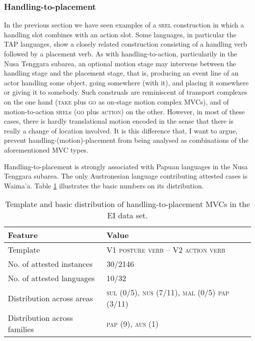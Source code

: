 \subsubsection{Handling-to-placement} \label{sec:handling-to-placement}
In the previous section we have seen examples of a \textsc{srel} construction in which a handling slot combines with an action slot. Some languages, in particular the \acs{TAP} languages, show a closely related construction consisting of a handling verb followed by a placement verb. As with handling-to-action, particularily in the Nusa Tenggara subarea, an optional motion stage may intervene between the handling stage and the placement stage, that is, producing an event line of an actor handling some object, going somewhere (with it), and placing it somewhere or giving it to somebody. Such construals are reminiscent of transport complexes on the one hand (\textsc{take} plus \textsc{go} as on-stage motion complex MVCs), and of motion-to-action \textsc{srel}s (\textsc{go} plus \textsc{action}) on the other. However, in most of these cases, there is hardly translational motion encoded in the sense that there is really a change of location involved. It is this difference that, I want to argue, prevent handling-(motion)-placement from being analysed as combinations of the aforementioned MVC types.

Handling-to-placement is strongly associated with Papuan languages in the Nusa Tenggara subarea. The only Austronesian language contributing attested cases is Waima'a. Table \ref{table:handling-to-placement} illustrates the basic numbers on its distribution.

\begin{table}


\begin{tabular}{ll}
\lsptoprule
Feature&Value\tabularnewline
\hline
Template&V1 \textsc{posture verb} -- V2 \textsc{action verb}\tabularnewline
No. of attested instances& 30/2146 \tabularnewline
No. of attested languages& 10/32 \tabularnewline
Distribution across areas& \textsc{sul} (0/5), \textsc{nus} (7/11), \textsc{mal} (0/5) \textsc{pap} (3/11) \tabularnewline
Distribution across families& \textsc{pap} (9), \textsc{aus} (1) \tabularnewline
\hline
\end{tabular}
\caption[Template and basic distribution of handling-to-placement MVCs]{Template and basic distribution of handling-to-placement MVCs in the EI data set.}
\label{table:handling-to-placement}
\end{table}


